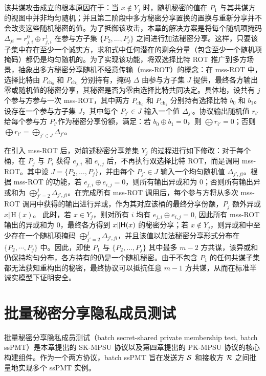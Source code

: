 该共谋攻击成立的根本原因在于：当 $x \notin Y_j$ 时，随机秘密的值在 $P_1$ 与其共谋方的视图中并非均匀随机；并且第二阶段中多方秘密分享置换的置换与重新分享并不会改变这些随机秘密的值。为了抵御该攻击，本章的解决方案是将每个随机项掩码 $\Delta_{ji} = r_{j,i}^0 \oplus r_{j,i}^1$ 在参与方子集 $\{P_2, \dots, P_j\}$ 之间进行加法秘密分享。这样，只要该子集中存在至少一个诚实方，求和式中任何潜在的剩余分量（包含至少一个随机项掩码）都仍是均匀随机的。为了实现该功能，将双选择比特 ROT 推广到多方场景，抽象出多方秘密分享随机不经意传输（mss-ROT）的概念：在 mss-ROT 中，选择比特由 $P_{\text{ch}_0}$ 和 $P_{\text{ch}_1}$ 分别持有，掩码 $\Delta$ 由参与方子集 $J$ 提供，最终各方输出零或随机值的秘密分享，其秘密是否为零由选择比特共同决定。具体地，设共有 $j$ 个参与方参与一次 mss-ROT，其中两方 $P_{\text{ch}_0}$ 和 $P_{\text{ch}_1}$ 分别持有选择比特 $b_0$ 和 $b_1$。设存在一个参与方子集 $J$，其中每个 $P_{j'} \in J$ 输入一个值 $\Delta_{j'}$。协议输出随机值 $r_{i'}$ 给每个参与方 $P_{i'}$作为秘密分享份额，满足：若 $b_0 \oplus b_1 = 0$，则 $\bigoplus r_{i'} = 0$；否则 $\bigoplus r_{i'} = \bigoplus_{j' \in J} \Delta_{j'}$。

在引入 mss-ROT 后，对前述秘密分享差集 $Y_j$ 的过程进行如下修改：对于每个桶，在 $P_j$ 与 $P_i$ 获得 $e_{j,i}$ 和 $e_{i,j}$ 后，不再执行双选择比特 ROT，而是调用 mss-ROT。其中设 $J = \{P_2, \dots, P_j\}$，并由每个 $P_{j'} \in J$ 输入一个均匀随机值 $\Delta_{j',ji}$。根据 mss-ROT 的功能，若 $e_{j,i} \oplus e_{i,j} = 0$，则所有输出异或和为 0；否则所有输出异或和为 $\bigoplus_{j'=2}^j \Delta_{j', ji}$。在完成所有 mss-ROT 调用后，每个参与方将从多次 mss-ROT 调用中获得的输出进行异或，作为其对应该桶的最终分享份额，$P_j$ 额外异或 $x \Vert \text{H}(x)$。
此时，若 $x \in Y_j$，则对所有 $i$ 均有 $e_{j,i} \oplus e_{i,j} = 0$, 因此所有 mss-ROT 输出的异或和为 $0$，最终各方得到 $x \Vert \mathsf{H}(x)$ 的秘密分享；若 $x \notin Y_j$，则异或和中至少存在一个随机项掩码 $\bigoplus_{j'=2}^j \Delta_{j', ji}$，并且该值以加法秘密分享形式分布在 $\{P_2,\cdots,P_j\}$ 中。因此，即使 $P_1$ 与 $\{P_2, \dots, P_j\}$ 其中最多 $m-2$ 方共谋，该异或和仍保持均匀分布，各方持有的仍是一个随机秘密。由于不包含 $P_1$ 的任何共谋子集都无法获知重构出的秘密，最终协议可以抵抗任意 $m-1$ 方共谋，从而在标准半诚实模型下证明安全。

\section{批量秘密分享隐私成员测试}

批量秘密分享隐私成员测试（batch secret-shared private membership test, batch ssPMT）是本章提出的 SK-MPSU 协议以及第四章提出的 PK-MPSU 协议的核心构建组件。作为一个两方协议，batch ssPMT 旨在发送方 $\mathcal{S}$ 和接收方 $\mathcal{R}$ 之间批量地实现多个 ssPMT 实例。

